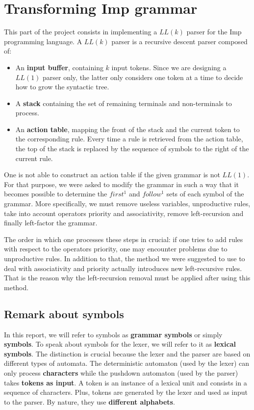 \chapter{Transforming Imp grammar}

This part of the project consists in implementing a $LL(k)$ parser for the Imp programming language. A $LL(k)$ parser is a recursive descent parser composed of:

\begin{itemize}
\item An \textbf{input buffer}, containing $k$ input tokens. Since we are designing a $LL(1)$ parser only, the latter only considers one token at a time to decide how to grow the syntactic tree.
\item A \textbf{stack} containing the set of remaining terminals and non-terminals to process.
\item An \textbf{action table}, mapping the front of the stack and the current token to the corresponding rule. Every time a rule is retrieved from the action table, the top of the stack is replaced by the sequence of symbols to the right of the current rule.
\end{itemize}

One is not able to construct an action table if the given grammar is not $LL(1)$. For that purpose, we were asked to modify the grammar in such a way
that it becomes possible to determine the $first^1$ and $follow^1$ sets of each symbol of the grammar. More specifically,
we must remove useless variables, unproductive rules, take into account operators priority and associativity, remove left-recursion and finally left-factor the grammar.

The order in which one processes these steps in crucial: if one tries to add rules with respect to the operators priority, one may encounter problems due
to unproductive rules. In addition to that, the method we were suggested to use to deal with associativity and priority actually introduces new left-recursive
rules. That is the reason why the left-recursion removal must be applied after using this method.

\section{Remark about symbols}
In this report, we will refer to symbols as \textbf{grammar symbols} or simply \textbf{symbols}. To speak about symbols for the lexer, we will refer to it as \textbf{lexical symbols}. The distinction is crucial because the lexer and the parser are based on different types of automata.
The deterministic automaton (used by the lexer) can only process \textbf{characters} while the pushdown automaton (used by the parser) takes
\textbf{tokens as input}. A token is an instance of a lexical unit and consists in a sequence of characters. Plus, tokens are generated by the lexer and
used as input to the parser. By nature, they use \textbf{different alphabets}.

